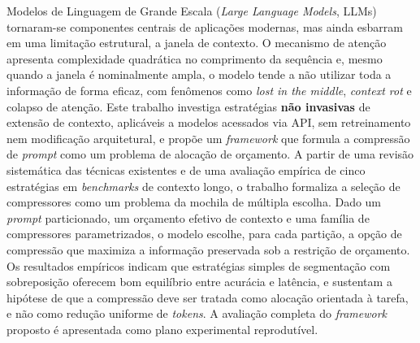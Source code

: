 \documentclass[12pt,a4paper,oneside]{report}
\begin{document}
Modelos de Linguagem de Grande Escala (\textit{Large Language Models}, LLMs) tornaram-se componentes centrais de aplicações modernas, mas ainda esbarram em uma limitação estrutural, a janela de contexto. O mecanismo de atenção apresenta complexidade quadrática no comprimento da sequência e, mesmo quando a janela é nominalmente ampla, o modelo tende a não utilizar toda a informação de forma eficaz, com fenômenos como \textit{lost in the middle}, \textit{context rot} e colapso de atenção. Este trabalho investiga estratégias \textbf{não invasivas} de extensão de contexto, aplicáveis a modelos acessados via API, sem retreinamento nem modificação arquitetural, e propõe um \textit{framework} que formula a compressão de \textit{prompt} como um problema de alocação de orçamento. A partir de uma revisão sistemática das técnicas existentes e de uma avaliação empírica de cinco estratégias em \textit{benchmarks} de contexto longo, o trabalho formaliza a seleção de compressores como um problema da mochila de múltipla escolha. Dado um \textit{prompt} particionado, um orçamento efetivo de contexto e uma família de compressores parametrizados, o modelo escolhe, para cada partição, a opção de compressão que maximiza a informação preservada sob a restrição de orçamento. Os resultados empíricos indicam que estratégias simples de segmentação com sobreposição oferecem bom equilíbrio entre acurácia e latência, e sustentam a hipótese de que a compressão deve ser tratada como alocação orientada à tarefa, e não como redução uniforme de \textit{tokens}. A avaliação completa do \textit{framework} proposto é apresentada como plano experimental reprodutível.

\tableofcontents
\listoffigures
\listoftables








\end{document}
